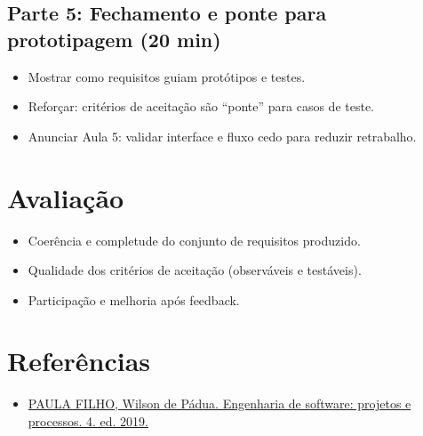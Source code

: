 \documentclass[12pt,a4paper]{article}
\begin{document}
\subsection*{Parte 5: Fechamento e ponte para prototipagem (20 min)}
\begin{itemize}[leftmargin=*,itemsep=0.35em]
  \item Mostrar como requisitos guiam protótipos e testes.
  \item Reforçar: critérios de aceitação são ``ponte'' para casos de teste.
  \item Anunciar Aula 5: validar interface e fluxo cedo para reduzir retrabalho.
\end{itemize}

\section{Avaliação}
\begin{itemize}[leftmargin=*,itemsep=0.25em]
  \item Coerência e completude do conjunto de requisitos produzido.
  \item Qualidade dos critérios de aceitação (observáveis e testáveis).
  \item Participação e melhoria após feedback.
\end{itemize}

\section{Referências}
\begin{itemize}[leftmargin=*,itemsep=0.25em]
  \item \href{../99-Materiais/Engenharia%20de%20software%20projetos%20e%20processos%20by%20Wilson%20de%20P%C3%A1dua%20Paula%20Filho%20.epub.pdf}{PAULA FILHO, Wilson de Pádua. Engenharia de software: projetos e processos. 4. ed. 2019.}
\end{itemize}
\end{document}

